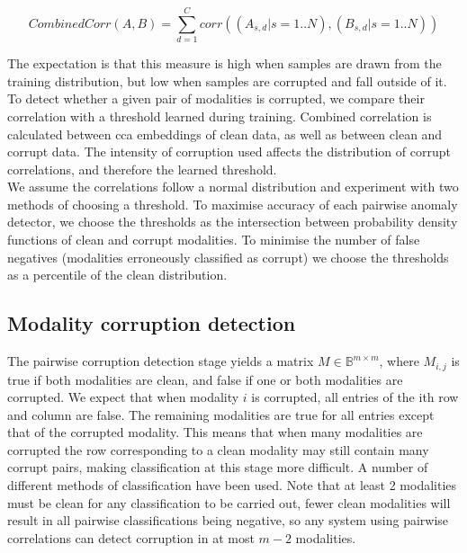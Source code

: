 $$CombinedCorr(A, B) = \sum_{d=1}^C{corr((A_{s,d} | s=1..N), (B_{s,d} | s=1..N))}$$

The expectation is that this measure is high when samples are drawn from the training distribution, but low when samples are corrupted and fall outside of it.\\

To detect whether a given pair of modalities is corrupted, we compare their correlation with a threshold learned during training. Combined correlation is calculated between cca embeddings of clean data, as well as between clean and corrupt data. The intensity of corruption used affects the distribution of corrupt correlations, and therefore the learned threshold.\\

We assume the correlations follow a normal distribution and experiment with two methods of choosing a threshold. To maximise accuracy of each pairwise anomaly detector, we choose the thresholds as the intersection between probability density functions of clean and corrupt modalities. To minimise the number of false negatives (modalities erroneously classified as corrupt) we choose the thresholds as a percentile of the clean distribution.



\subsection{Modality corruption detection}
The pairwise corruption detection stage yields a matrix $M\in\mathbb{B}^{m\times m}$, where $M_{i,j}$ is true if both modalities are clean, and false if one or both modalities are corrupted. We expect that when modality $i$ is corrupted, all entries of the ith row and column are false. The remaining modalities are true for all entries except that of the corrupted modality. This means that when many modalities are corrupted the row corresponding to a clean modality may still contain many corrupt pairs, making classification at this stage more difficult. A number of different methods of classification have been used. Note that at least 2 modalities must be clean for any classification to be carried out, fewer clean modalities will result in all pairwise classifications being negative, so any system using pairwise correlations can detect corruption in at most $m-2$ modalities.

